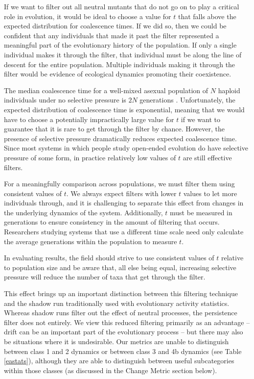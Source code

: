 \documentclass[letterpaper]{article}
\begin{document}
If we want to filter out all neutral mutants that do not go on to play a critical role in evolution, it would be ideal to choose a value for $t$ that falls above the expected distribution for coalescence times. If we did so, then we could be confident that any individuals that made it past the filter represented a meaningful part of the evolutionary history of the population. If only a single individual makes it through the filter, that individual must be along the line of descent for the entire population. Multiple individuals making it through the filter would be evidence of ecological dynamics promoting their coexistence.

The median coalescence time for a well-mixed asexual population of $N$ haploid individuals under no selective pressure is $2N$ generations \citep{fu_coalescing_1999}.  Unfortunately, the expected distribution of coalescence time is exponential, meaning that we would have to choose a potentially impractically large value for $t$ if we want to guarantee that it is rare to get through the filter by chance. However, the presence of selective pressure dramatically reduces expected coalescence time. Since most systems in which people study open-ended evolution do have selective pressure of some form, in practice relatively low values of $t$ are still effective filters.

For a meaningfully comparison across populations, we must filter them using consistent values of $t$. We always expect filters with lower $t$ values to let more individuals through, and it is challenging to separate this effect from changes in the underlying dynamics of the system. Additionally, $t$ must be measured in generations to ensure consistency in the amount of filtering that occurs. Researchers studying systems that use a different time scale need only calculate the average generations within the population to measure $t$.

In evaluating results, the field should strive to use consistent values of $t$ relative to population size and be aware that, all else being equal, increasing selective pressure will reduce the number of taxa that get through the filter.

This effect brings up an important distinction between this filtering technique and the shadow run traditionally used with evolutionary activity statistics. Whereas shadow runs filter out the effect of neutral processes, the persistence filter does not entirely. We view this reduced filtering primarily as an advantage -- drift can be an important part of the evolutionary process -- but there may also be situations where it is undesirable. Our metrics are unable to distinguish between class 1 and 2 dynamics or between class 3 and 4b dynamics (see Table \ref{eastats}), although they are able to distinguish between useful subcategories within those classes (as discussed in the Change Metric section below).
\end{document}
